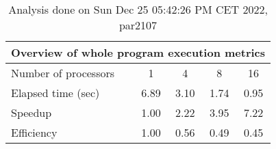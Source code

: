 \begin{table}[h]
\begin{center}
\begin{tabular}{|l|c|c|c|c|}
\hline
\multicolumn{5}{|c|}{Overview of whole program execution metrics} \\
\hline
\hline
Number of processors & 1 & 4 & 8 & 16 \\
\hline
Elapsed time (sec)      &       6.89 &       3.10 &       1.74 &       0.95 \\
\hline
Speedup                 &       1.00 &       2.22 &       3.95 &       7.22 \\
\hline
Efficiency              &       1.00 &       0.56 &       0.49 &       0.45 \\
\hline
\end{tabular}
\end{center}
\caption{ Analysis done on Sun Dec 25 05:42:26 PM CET 2022, par2107}
\end{table}
